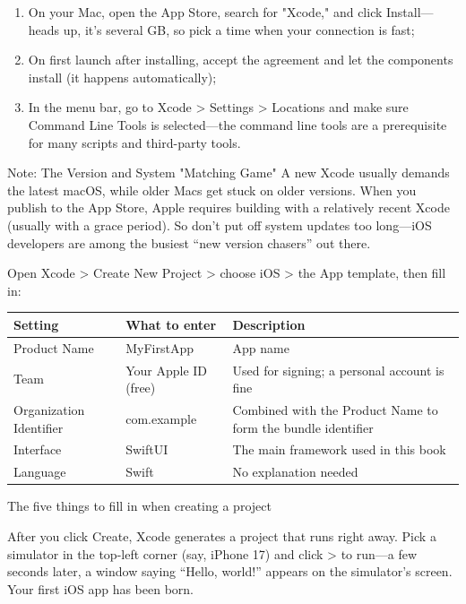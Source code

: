 \begin{enumerate}
  \item On your Mac, open the App Store, search for "Xcode," and click Install—heads up, it's several GB, so pick a time when your connection is fast;
  \item On first launch after installing, accept the agreement and let the components install (it happens automatically);
  \item In the menu bar, go to Xcode > Settings > Locations and make sure Command Line Tools is selected—the command line tools are a prerequisite for many scripts and third-party tools.
\end{enumerate}

\begin{tcbwarn}{Note: The Version and System "Matching Game"}
A new Xcode usually demands the latest macOS, while older Macs get stuck on older versions. When you publish to the App Store, Apple requires building with a relatively recent Xcode (usually with a grace period). So don't put off system updates too long—iOS developers are among the busiest “new version chasers” out there.

\end{tcbwarn}


Open Xcode > Create New Project > choose iOS > the App template, then fill in:

\begin{center}
\begin{tabularx}{\linewidth}{|X|X|X|}
\hline
\textbf{Setting} & \textbf{What to enter} & \textbf{Description} \tabularnewline
\hline
Product Name & MyFirstApp & App name \tabularnewline
Team & Your Apple ID (free) & Used for signing; a personal account is fine \tabularnewline
Organization Identifier & com.example & Combined with the Product Name to form the bundle identifier \tabularnewline
Interface & SwiftUI & The main framework used in this book \tabularnewline
Language & Swift & No explanation needed \tabularnewline
\hline
\end{tabularx}
\end{center}

\begin{center}\small\color{gray}The five things to fill in when creating a project\end{center}

After you click Create, Xcode generates a project that runs right away. Pick a simulator in the top-left corner (say, iPhone 17) and click > to run—a few seconds later, a window saying “Hello, world!” appears on the simulator's screen. Your first iOS app has been born.

